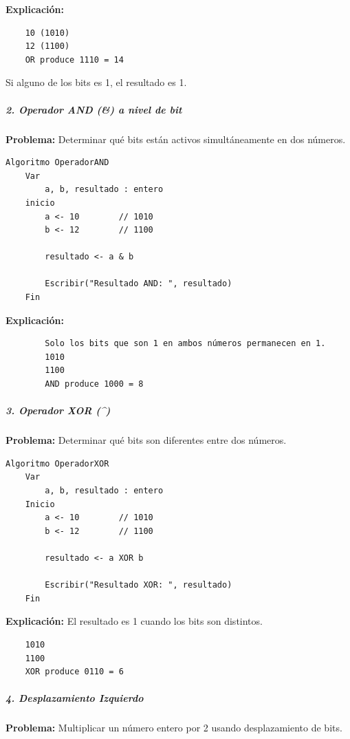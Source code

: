 \documentclass[12pt,twoside]{book}
\begin{document}
						\noindent
						\textbf{Explicación:}
						\begin{lstlisting}
	10 (1010)  
	12 (1100)  
	OR produce 1110 = 14  \end{lstlisting}  
						Si alguno de los bits es 1, el resultado es 1.
						
						\subparagraph{2. Operador AND (\&) a nivel de bit}
						\noindent
						\textbf{Problema:} Determinar qué bits están activos simultáneamente en dos números.
						
						\begin{lstlisting}[style=upsamStyle,caption={Operador AND (\&) a nivel de bit}]
	Algoritmo OperadorAND
	Var
		a, b, resultado : entero
	inicio
		a <- 10        // 1010
		b <- 12        // 1100
		
		resultado <- a & b
		
		Escribir("Resultado AND: ", resultado)
	Fin \end{lstlisting}
						
						\noindent
						\textbf{Explicación:}
						\begin{lstlisting}
		Solo los bits que son 1 en ambos números permanecen en 1.  
		1010
		1100  
		AND produce 1000 = 8  \end{lstlisting}				
						\subparagraph{3. Operador XOR (\textasciicircum )}
						
						\noindent
						\textbf{Problema:} Determinar qué bits son diferentes entre dos números.
						
						\begin{lstlisting}[style=upsamStyle,caption={Determininar los bits diferentes entre dos números}]
	Algoritmo OperadorXOR
	Var
		a, b, resultado : entero
	Inicio
		a <- 10        // 1010
		b <- 12        // 1100
		
		resultado <- a XOR b
		
		Escribir("Resultado XOR: ", resultado)
	Fin \end{lstlisting}
						
						\noindent
						\textbf{Explicación:} El resultado es 1 cuando los bits son distintos. 
						\begin{lstlisting}
	1010
	1100
	XOR produce 0110 = 6 \end{lstlisting}
						\subparagraph{4. Desplazamiento Izquierdo}
						
						\noindent
						\textbf{Problema:} Multiplicar un número entero por 2 usando desplazamiento de bits.
						
\end{document}
